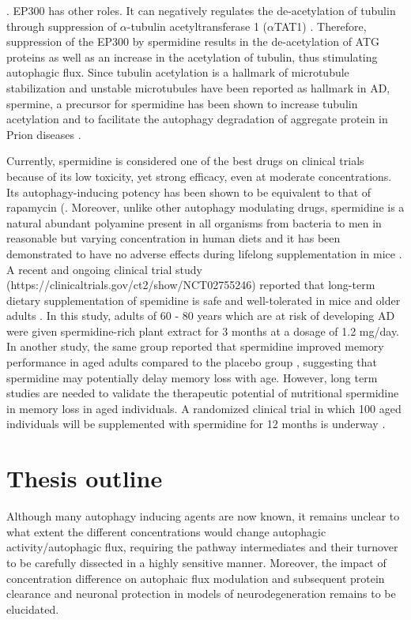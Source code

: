 \citep{Eisenberg2014,Lee2009,Sebti2014}. EP300 has other roles. It can negatively regulates the de-acetylation of tubulin through suppression of $\alpha$-tubulin acetyltransferase 1 ($\alpha$TAT1) \citep{Mackeh2014}. Therefore, suppression of the EP300 by spermidine results in the de-acetylation of ATG proteins as well as an  increase in the acetylation of tubulin, thus stimulating autophagic flux. Since tubulin acetylation is a hallmark of microtubule stabilization and unstable microtubules have been reported as hallmark in AD, spermine, a precursor for spermidine has been shown to increase tubulin acetylation and to facilitate the autophagy  degradation of aggregate protein in Prion diseases \citep{Phadwal2018}.

Currently, spermidine is considered one of the best drugs on clinical trials because of its low toxicity, yet strong efficacy, even at moderate concentrations. Its autophagy-inducing potency has been shown to be equivalent to that of rapamycin (\citep{DuToit2018b}. Moreover, unlike other autophagy modulating drugs, spermidine is a natural abundant polyamine present in all organisms from bacteria to men in reasonable but varying concentration in human diets and it has been demonstrated to have no adverse effects during lifelong supplementation in mice \citep{Eisenberg2016a}. A recent and ongoing clinical trial study (https://clinicaltrials.gov/ct2/show/NCT02755246) reported that long-term dietary supplementation of spemidine is safe and well-tolerated in mice and older adults \citep{Schwarz2018}. In this study, adults of 60 - 80 years which are at risk of developing AD were given spermidine-rich plant extract for 3 months at a dosage of 1.2 mg/day. In another study, the same group reported that spermidine improved memory performance in aged adults compared to the placebo group \citep{Wirth2018}, suggesting that spermidine may potentially delay memory loss with age. However, long term studies are needed to validate the therapeutic potential of nutritional spermidine in memory loss in aged individuals. A randomized clinical trial in which 100 aged individuals will be supplemented with spermidine for 12 months is underway \citep{Wirth2019}.

\section{Thesis outline}
Although many autophagy inducing agents are now known, it remains unclear to what extent the different concentrations would change autophagic activity/autophagic flux, requiring the pathway intermediates and their turnover to be carefully dissected  in a highly sensitive manner. Moreover, the impact of concentration difference on autophaic flux modulation and subsequent protein clearance and neuronal protection in models of neurodegeneration remains to be elucidated. 

